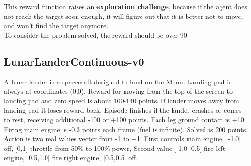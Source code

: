 \documentclass[11pt]{article}
\begin{document}
This reward function raises an \textbf{exploration challenge}, because if the agent does
not reach the target soon enough, it will figure out that it is better not to move, 
and won't find the target anymore.
\\
To consider the problem solved, the reward should be over 90.


\subsection{LunarLanderContinuous-v0}
A lunar lander is a spacecraft designed to land on the Moon. Landing pad is always at coordinates
(0,0). Reward for moving from the top of the screen to landing pad and zero speed is about 100-140
points. If lander moves away from landing pad it loses reward back. Episode finishes if the lander
crashes or comes to rest, receiving additional -100 or +100 points. Each leg ground contact is +10.
Firing main engine is -0.3 points each frame (fuel is infinite). Solved is 200 points. Action is two
real values vector from -1 to +1. First controls main engine, [-1,0] off, [0,1] throttle from 50\%
to 100\% power, Second value [-1.0,-0.5] fire left engine, [0.5,1.0] fire right engine, [0.5,0.5]
off.
\end{document}
